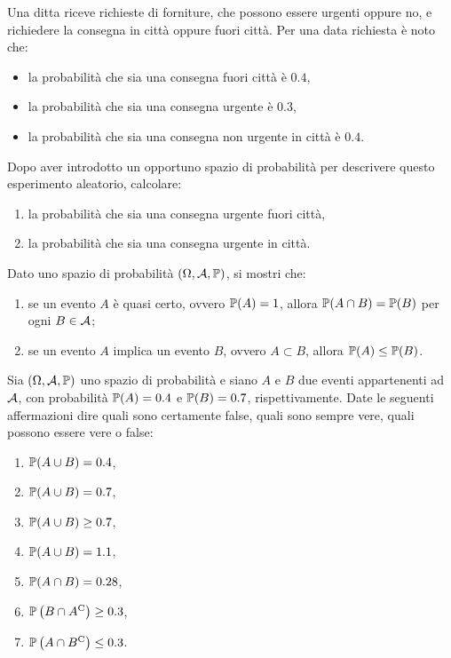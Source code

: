 \Esercizio{}

Una ditta riceve richieste di forniture, che possono essere urgenti oppure no, e richiedere la consegna in città oppure fuori città. Per una data richiesta è noto che:
\begin{itemize}
	\item la probabilità che sia una consegna fuori città è $0.4$,
	\item la probabilità che sia una consegna urgente è $0.3$,
	\item la probabilità che sia una consegna non urgente in città è $0.4$.
\end{itemize}
Dopo aver introdotto un opportuno spazio di probabilità per descrivere questo esperimento aleatorio, calcolare:
\begin{enumerate}
	\item la probabilità che sia una consegna urgente fuori città,
	\item la probabilità che sia una consegna urgente in città.
\end{enumerate}

\Esercizio{}

Dato uno spazio di probabilità $(\Omega,\mathcal{A},\mathbb{P})$, si mostri che:
\begin{enumerate}
	\item se un evento $A$ è quasi certo, ovvero $\mathbb{P}(A) =1$, allora $\mathbb{P}(A\cap B) =\mathbb{P}(B)$ per ogni $B\in \mathcal{A}$;
	\item se un evento $A$ implica un evento $B$, ovvero $A\subset B$, allora $\mathbb{P}(A) \leq \mathbb{P}(B)$.
\end{enumerate}

\Esercizio{}

Sia $(\Omega,\mathcal{A},\mathbb{P})$ uno spazio di probabilità e siano $A$ e $B$ due eventi appartenenti ad $\mathcal{A}$, con probabilità $\mathbb{P}(A) =0.4$ e $\mathbb{P}(B) =0.7$, rispettivamente. Date le seguenti affermazioni dire quali sono certamente false, quali sono sempre vere, quali possono essere vere o false:
\begin{enumerate}
	\item $\mathbb{P}( A\cup B) =0.4$,
	\item $\mathbb{P}( A\cup B) =0.7$,
	\item $\mathbb{P}( A\cup B) \geq 0.7$,
	\item $\mathbb{P}( A\cup B) =1.1$,
	\item $\mathbb{P}( A\cap B) =0.28$,
	\item $\mathbb{P}\left( B\cap A^{\mathrm{C}}\right) \geq 0.3$,
	\item $\mathbb{P}\left( A\cap B^{\mathrm{C}}\right) \leq 0.3$.
\end{enumerate}

